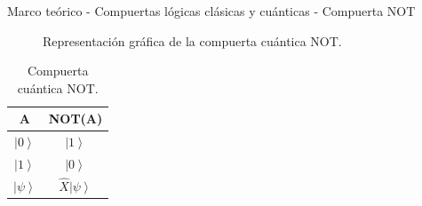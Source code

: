 \begin{frame}{Marco teórico - Compuertas lógicas clásicas y cuánticas - Compuerta NOT}
\begin{minipage}{0.49\linewidth}
\begin{figure}[H]
        \caption{Representación gráfica de la compuerta cuántica NOT.}
    \end{figure}
    \begin{table}[H]
        \centering
        \begin{tabular}{cc} \hline
            A & NOT(A) \\ \hline
            $\left| 0 \right\rangle$ & $\left| 1 \right\rangle$ \\
            $\left| 1\right\rangle$ & $\left| 0 \right\rangle$ \\
            $\left| \psi \right\rangle$ & $\hat{X}\left| \psi \right\rangle$ \\ \hline
        \end{tabular}
        \caption{Compuerta cuántica NOT.}
    \end{table}
\end{minipage} 
\end{frame}
